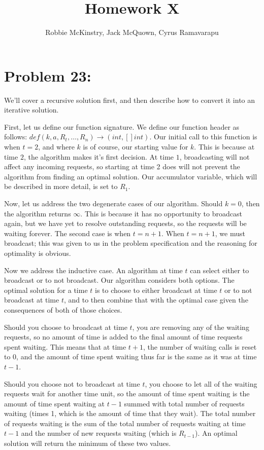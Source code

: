 \documentclass[12pt]{article}
\begin{document}
\title{Homework X}
\author{Robbie McKinstry, Jack McQuown, Cyrus Ramavarapu}
\renewcommand{\today}{27 September 2016}
\renewcommand{\baselinestretch}{1.5}
\maketitle

\section*{Problem 23: }

We'll cover a recursive solution first, and then describe how to convert it into an iterative solution.

First, let us define our function signature. We define our function header as follows: $def(k, a, R_{t}, \dots, R_{n}) \rightarrow (int, []int)$. Our initial call to this function is when $t=2$, and where $k$ is of course, our starting value for $k$. This is because at time $2$, the algorithm makes it's first decision. At time $1$, broadcasting will not affect any incoming requests, so starting at time 2 does will not prevent the algorithm from finding an optimal solution. Our accumulator variable, which will be described in more detail, is set to $R_{1}$.

Now, let us address the two degenerate cases of our algorithm. Should $k=0$, then the algorithm returns $\infty$. This is because it has no opportunity to broadcast again, but we have yet to resolve outstanding requests, so the requests will be waiting forever. The second case is when $t=n+1$. When $t=n+1$, we must broadcast; this was given to us in the problem specification and the reasoning for optimality is obvious. 

Now we address the inductive case. An algorithm at time $t$ can select either to broadcast or to not broadcast. Our algorithm considers both options. The optimal solution for a time $t$ is to choose to either broadcast at time $t$ or to not broadcast at time $t$, and to then combine that with the optimal case given the consequences of both of those choices.

Should you choose to broadcast at time $t$, you are removing any of the waiting requests, so no amount of time is added to the final amount of time requests spent waiting. This means that at time $t+1$, the number of waiting calls is reset to 0, and the amount of time spent waiting thus far is the same as it was at time $t-1$.

Should you choose not to broadcast at time $t$, you choose to let all of the waiting requests wait for another time unit, so the amount of time spent waiting is the amount of time spent waiting at $t-1$ summed with total number of requests waiting (times 1, which is the amount of time that they wait). The total number of requests waiting is the sum of the total number of requests waiting at time $t-1$ and the number of new requests waiting (which is $R_{t-1}$). An optimal solution will return the minimum of these two values.
\end{document}
